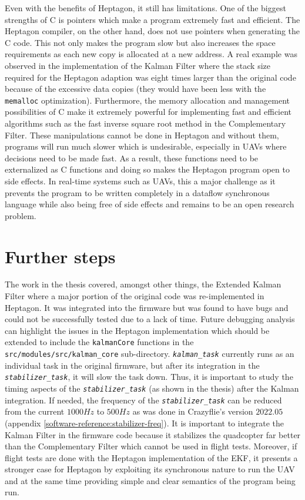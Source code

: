 \documentclass[10pt, a4paper]{article}
\newcommand{\textFunc}[1]{\texttt{\textit{#1}}}
\newcommand{\code}[1]{\texttt{#1}}
\begin{document}
    Even with the benefits of Heptagon, it still has limitations. One of the biggest strengths of C is pointers which make a program extremely fast and efficient. The Heptagon compiler, on the other hand, does not use pointers when generating the C code. This not only makes the program slow but also increases the space requirements as each new copy is allocated at a new address. A real example was observed in the implementation of the Kalman Filter where the stack size required for the Heptagon adaption was eight times larger than the original code because of the excessive data copies (they would have been less with the \code{memalloc} optimization). Furthermore, the memory allocation and management possibilities of C make it extremely powerful for implementing fast and efficient algorithms such as the fast inverse square root method in the Complementary Filter. These manipulations cannot be done in Heptagon and without them, programs will run much slower which is undesirable, especially in UAVs where decisions need to be made fast. As a result, these functions need to be externalized as C functions and doing so makes the Heptagon program open to side effects. In real-time systems such as UAVs, this a major challenge as it prevents the program to be written completely in a dataflow synchronous language while also being free of side effects and remains to be an open research problem.

\section{Further steps}
    The work in the thesis covered, amongst other things, the Extended Kalman Filter where a major portion of the original code was re-implemented in Heptagon. It was integrated into the firmware but was found to have bugs and could not be successfully tested due to a lack of time. Future debugging analysis can highlight the issues in the Heptagon implementation which should be extended to include the \code{kalmanCore} functions in the \code{src/modules/src/kalman\_core} sub-directory. \textFunc{kalman\_task} currently runs as an individual task in the original firmware, but after its integration in the \textFunc{stabilizer\_task}, it will slow the task down. Thus, it is important to study the timing aspects of the \textFunc{stabilizer\_task} (as shown in the thesis) after the Kalman integration. If needed, the frequency of the \textFunc{stabilizer\_task} can be reduced from the current $1000Hz$ to $500Hz$ as was done in Crazyflie's version $2022.05$ (appendix \ref{software-reference:stabilizer-freq}). It is important to integrate the Kalman Filter in the firmware code because it stabilizes the quadcopter far better than the Complementary Filter which cannot be used in flight tests. Moreover, if flight tests are done with the Heptagon implementation of the EKF, it presents a stronger case for Heptagon by exploiting its synchronous nature to run the UAV and at the same time providing simple and clear semantics of the program being run.
\end{document}
